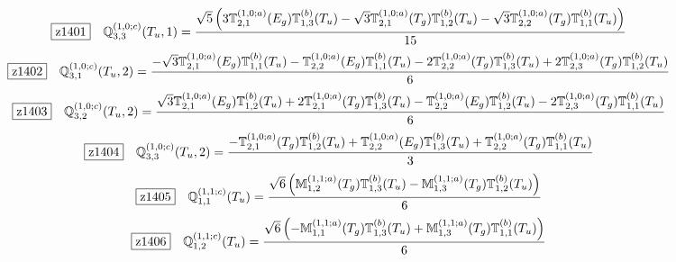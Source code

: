 \documentclass[fleqn,10pt,landscape]{jsarticle}
\begin{document}
\begin{dmath*}
\hspace*{3mm}\fbox{z1401}\quad \mathbb{Q}_{3,3}^{(1,0;c)}(T_{u},1)=\frac{\sqrt{5} \left(3 \mathbb{T}_{2,1}^{(1,0;a)}(E_{g}) \mathbb{T}_{1,3}^{(b)}(T_{u}) - \sqrt{3} \mathbb{T}_{2,1}^{(1,0;a)}(T_{g}) \mathbb{T}_{1,2}^{(b)}(T_{u}) - \sqrt{3} \mathbb{T}_{2,2}^{(1,0;a)}(T_{g}) \mathbb{T}_{1,1}^{(b)}(T_{u})\right)}{15}
\end{dmath*}
\begin{dmath*}
\hspace*{3mm}\fbox{z1402}\quad \mathbb{Q}_{3,1}^{(1,0;c)}(T_{u},2)=\frac{- \sqrt{3} \mathbb{T}_{2,1}^{(1,0;a)}(E_{g}) \mathbb{T}_{1,1}^{(b)}(T_{u}) - \mathbb{T}_{2,2}^{(1,0;a)}(E_{g}) \mathbb{T}_{1,1}^{(b)}(T_{u}) - 2 \mathbb{T}_{2,2}^{(1,0;a)}(T_{g}) \mathbb{T}_{1,3}^{(b)}(T_{u}) + 2 \mathbb{T}_{2,3}^{(1,0;a)}(T_{g}) \mathbb{T}_{1,2}^{(b)}(T_{u})}{6}
\end{dmath*}
\begin{dmath*}
\hspace*{3mm}\fbox{z1403}\quad \mathbb{Q}_{3,2}^{(1,0;c)}(T_{u},2)=\frac{\sqrt{3} \mathbb{T}_{2,1}^{(1,0;a)}(E_{g}) \mathbb{T}_{1,2}^{(b)}(T_{u}) + 2 \mathbb{T}_{2,1}^{(1,0;a)}(T_{g}) \mathbb{T}_{1,3}^{(b)}(T_{u}) - \mathbb{T}_{2,2}^{(1,0;a)}(E_{g}) \mathbb{T}_{1,2}^{(b)}(T_{u}) - 2 \mathbb{T}_{2,3}^{(1,0;a)}(T_{g}) \mathbb{T}_{1,1}^{(b)}(T_{u})}{6}
\end{dmath*}
\begin{dmath*}
\hspace*{3mm}\fbox{z1404}\quad \mathbb{Q}_{3,3}^{(1,0;c)}(T_{u},2)=\frac{- \mathbb{T}_{2,1}^{(1,0;a)}(T_{g}) \mathbb{T}_{1,2}^{(b)}(T_{u}) + \mathbb{T}_{2,2}^{(1,0;a)}(E_{g}) \mathbb{T}_{1,3}^{(b)}(T_{u}) + \mathbb{T}_{2,2}^{(1,0;a)}(T_{g}) \mathbb{T}_{1,1}^{(b)}(T_{u})}{3}
\end{dmath*}
\begin{dmath*}
\hspace*{3mm}\fbox{z1405}\quad \mathbb{Q}_{1,1}^{(1,1;c)}(T_{u})=\frac{\sqrt{6} \left(\mathbb{M}_{1,2}^{(1,1;a)}(T_{g}) \mathbb{T}_{1,3}^{(b)}(T_{u}) - \mathbb{M}_{1,3}^{(1,1;a)}(T_{g}) \mathbb{T}_{1,2}^{(b)}(T_{u})\right)}{6}
\end{dmath*}
\begin{dmath*}
\hspace*{3mm}\fbox{z1406}\quad \mathbb{Q}_{1,2}^{(1,1;c)}(T_{u})=\frac{\sqrt{6} \left(- \mathbb{M}_{1,1}^{(1,1;a)}(T_{g}) \mathbb{T}_{1,3}^{(b)}(T_{u}) + \mathbb{M}_{1,3}^{(1,1;a)}(T_{g}) \mathbb{T}_{1,1}^{(b)}(T_{u})\right)}{6}
\end{dmath*}
\end{document}
